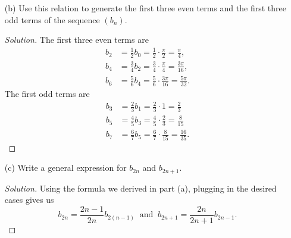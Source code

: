 \begin{enumerate}
\begin{proof}
        Finally, subtracting the second term on the right side of (1), simplifying, and dividing by \( n  \) on both sides gives us our desired result
        \begin{align*}
            b_{n}  &= \int_{ 0 }^{ \frac{ \pi }{ 2 }  }  \sin^{n}(x) \ dx \\ &= \frac{ n-1 }{ n } \int_{ 0 }^{ \frac{ \pi }{ 2 }  } \sin^{n-2}(x) \ dx \\
                                                                &= \frac{ n-1 }{ n } b_{n-2}.
        \end{align*}
        \end{proof}
    \item[(b)] Use this relation to generate the first three even terms and the first three odd terms of the sequence \( (b_{n}) \).
        \begin{proof}[Solution]
        The first three even terms are 
		\begin{align*}
		    b_{2} &= \frac{ 1 }{ 2 }  b_{0} = \frac{ 1 }{ 2 } \cdot \frac{ \pi }{ 2 } = \frac{ \pi }{ 4 },  \\
			b_{4} &= \frac{ 3 }{ 4 } b_{2} = \frac{ 3 }{ 4 }  \cdot \frac{ \pi }{ 4 }  = \frac{ 3 \pi   }{ 16 }, \\
			b_{6} &= \frac{ 5 }{ 6 } b_{4} = \frac{ 5 }{ 6 } \cdot \frac{ 3 \pi }{ 16 } = \frac{ 5 \pi }{ 32 }. 
		\end{align*}
		The first odd terms are 
		\begin{align*}
		    b_{3} &= \frac{ 2 }{ 3 }  b_{1} = \frac{ 2 }{ 3 } \cdot 1 = \frac{ 2 }{ 3 }    \\
			b_{5} &= \frac{ 4 }{ 5 } b_{3} = \frac{ 4 }{ 5 }  \cdot \frac{ 2 }{ 3 } = \frac{ 8 }{ 15 }  \\
			b_{7} &= \frac{ 6 }{ 7 }  b_{5} = \frac{ 6 }{ 7 }  \cdot \frac{ 8 }{ 15 }  = \frac{ 16 }{ 35 }.
		\end{align*}
        \end{proof}
    \item[(c)] Write a general expression for \( b_{2n} \) and \( b_{2n+1}  \).
        \begin{proof}[Solution]
        Using the formula we derived in part (a), plugging in the desired cases gives us
        \[  b_{2n} = \frac{ 2n -1  }{ 2n  }  b_{2(n-1)} \ \text{ and } \  b_{2n+1} = \frac{ 2n }{ 2n+1 } b_{2n-1}.  \]

        \end{proof}
\end{enumerate}

